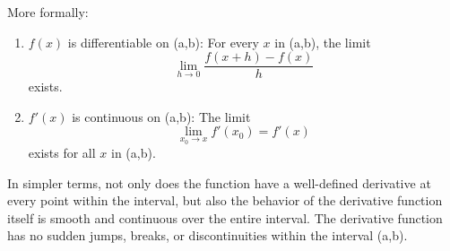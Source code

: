 More formally:

\begin{enumerate}
    \item \( f(x) \) is differentiable on (a,b): For every \( x \) in (a,b), the limit
    \[ \lim_{h \to 0} \frac{f(x + h) - f(x)}{h} \]
    exists.
  
    \item \( f'(x) \) is continuous on (a,b): The limit
    \[ \lim_{x_0 \to x} f'(x_0) = f'(x) \]
    exists for all \( x \) in (a,b).
\end{enumerate}

In simpler terms, not only does the function have a well-defined derivative at every point within the interval, but also the behavior of the derivative function itself is smooth and continuous over the entire interval. The derivative function has no sudden jumps, breaks, or discontinuities within the interval (a,b).





